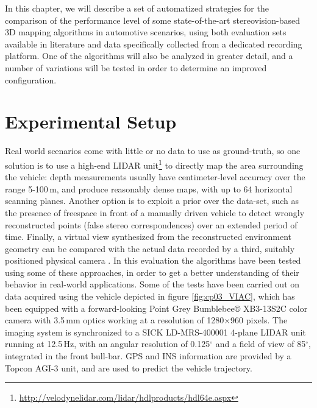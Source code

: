 In this chapter, we will describe a set of automatized strategies for the comparison of the performance level of some state-of-the-art stereovision-based 3D mapping algorithms in automotive scenarios, using both evaluation sets available in literature and data specifically collected from a dedicated recording platform. One of the algorithms will also be analyzed in greater detail, and a number of variations will be tested in order to determine an improved configuration.

\section{Experimental Setup}\label{ch:chapter03_01}

Real world scenarios come with little or no data to use as ground-truth, so one solution \citep{Morales2011, Geiger2012} is to use a high-end \ac{LIDAR} unit\footnote{\url{http://velodynelidar.com/lidar/hdlproducts/hdl64e.aspx}} to directly map the area surrounding the vehicle: depth measurements usually have centimeter-level accuracy over the range 5-100\,m, and produce reasonably dense maps, with up to 64 horizontal scanning planes. Another option is to exploit a prior over the data-set, such as the presence of freespace in front of a manually driven vehicle \cite{Steingrube2009} to detect wrongly reconstructed points (false stereo correspondences) over an extended period of time. Finally, a virtual view synthesized from the reconstructed environment geometry can be compared with the actual data recorded by a third, suitably positioned physical camera \cite{Morales2011, Morales2009}.
In this evaluation the algorithms have been tested using some of these approaches, in order to get a better understanding of their behavior in real-world applications. Some of the tests have been carried out on data acquired using the vehicle depicted in figure \ref{fig:cp03_VIAC}, which has been equipped with a forward-looking Point Grey Bumblebee® XB3-13S2C color camera with 3.5\,mm optics working at a resolution of 1280$\times$960 pixels. The imaging system is synchronized to a SICK LD-MRS-400001 4-plane LIDAR unit running at 12.5\,Hz, with an angular resolution of 0.125$^\circ$ and a field of view of 85$^\circ$, integrated in the front bull-bar. GPS and INS information are provided by a Topcon AGI-3 unit, and are used to predict the vehicle trajectory.

